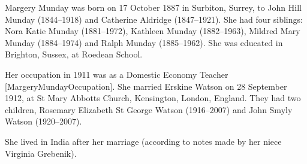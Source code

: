Margery Munday was born on 17 October 1887 in	Surbiton, Surrey, to John Hill Munday (1844--1918) and Catherine Aldridge (1847--1921). She had four siblings: Nora Katie Munday (1881--1972), Kathleen Munday (1882--1963), Mildred Mary Munday (1884--1974) and Ralph Munday (1885--1962).
She was educated in Brighton, Sussex, at Roedean School.

Her occupation in 1911 was as a Domestic Economy Teacher [MargeryMundayOccupation].
She married Erskine Watson on 28 September 1912, at St Mary Abbotts Church, Kensington, London, England.  They had two children, Rosemary Elizabeth St George Watson (1916--2007) and John Smyly Watson (1920--2007).

She lived in India after her marriage (according to notes made by her niece Virginia Grebenik).

